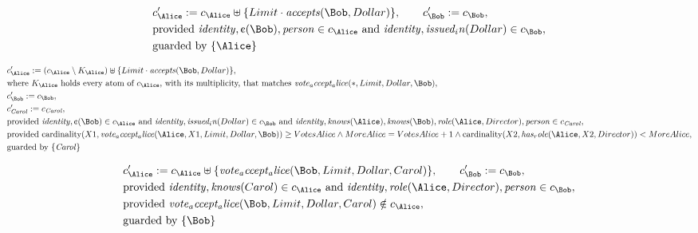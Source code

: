 \begin{align*}
&
c'_
{
\Alice
}
 := 
c_
{
\Alice
}
 \uplus 
\{
Limit
\cdot
\mathit{
accepts
}
(
\Bob
,
Dollar
)
\}
, \qquad 
c'_
{
\Bob
}
 := 
c_
{
\Bob
}
,\\
&
\text{provided } 
\mathit{
identity
}
,
\text{\textcent}
(
\Bob
)
,
\mathit{
person
}
 \in c_
{
\Alice
}
 \text{ and } 
\mathit{
identity
}
,
\mathit{
issued_in
}
(
Dollar
)
 \in c_
{
\Bob
}
,\\
&
\text{guarded by } \{
\Alice
\}
\end{align*}

\begin{align*}
&
c'_
{
\Alice
}
 := 
(
c_
{
\Alice
}
 \setminus K_
{
\Alice
}
) \uplus 
\{
Limit
\cdot
\mathit{
accepts
}
(
\Bob
,
Dollar
)
\}
,\\
&
\text{where } K_
{
\Alice
}
 \text{ holds every atom of } c_
{
\Alice
}
 \text{, with its multiplicity, that matches } 
\mathit{
vote_accept_alice
}
(
\ast
,
Limit
,
Dollar
,
\Bob
)
,\\
&
c'_
{
\Bob
}
 := 
c_
{
\Bob
}
,\\
&
c'_
{
\mathit{Carol}
}
 := 
c_
{
\mathit{Carol}
}
,\\
&
\text{provided } 
\mathit{
identity
}
,
\text{\textcent}
(
\Bob
)
 \in c_
{
\Alice
}
 \text{ and } 
\mathit{
identity
}
,
\mathit{
issued_in
}
(
Dollar
)
 \in c_
{
\Bob
}
 \text{ and } 
\mathit{
identity
}
,
\mathit{
knows
}
(
\Alice
)
,
\mathit{
knows
}
(
\Bob
)
,
\mathit{
role
}
(
\Alice
,
Director
)
,
\mathit{
person
}
 \in c_
{
\mathit{Carol}
}
,\\
&
\text{provided } 
\mathrm{cardinality}(
X1
,
\mathit{
vote_accept_alice
}
(
\Alice
,
X1
,
Limit
,
Dollar
,
\Bob
)
)
\ge
VotesAlice
\land
MoreAlice
=
VotesAlice
+
1
\land
\mathrm{cardinality}(
X2
,
\mathit{
has_role
}
(
\Alice
,
X2
,
Director
)
)
<
MoreAlice
,\\
&
\text{guarded by } \{
\mathit{Carol}
\}
\end{align*}

\begin{align*}
&
c'_
{
\Alice
}
 := 
c_
{
\Alice
}
 \uplus 
\{
\mathit{
vote_accept_alice
}
(
\Bob
,
Limit
,
Dollar
,
Carol
)
\}
, \qquad 
c'_
{
\Bob
}
 := 
c_
{
\Bob
}
,\\
&
\text{provided } 
\mathit{
identity
}
,
\mathit{
knows
}
(
Carol
)
 \in c_
{
\Alice
}
 \text{ and } 
\mathit{
identity
}
,
\mathit{
role
}
(
\Alice
,
Director
)
,
\mathit{
person
}
 \in c_
{
\Bob
}
,\\
&
\text{provided } 
\mathit{
vote_accept_alice
}
(
\Bob
,
Limit
,
Dollar
,
Carol
)
 \notin c_
{
\Alice
}
,\\
&
\text{guarded by } \{
\Bob
\}
\end{align*}
